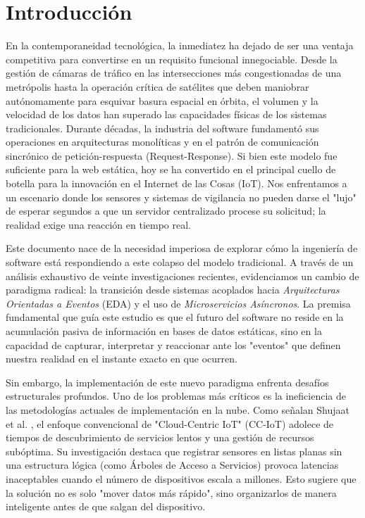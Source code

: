 \section{Introducción}

En la contemporaneidad tecnológica, la inmediatez ha dejado de ser una ventaja competitiva para convertirse en un requisito funcional innegociable. Desde la gestión de cámaras de tráfico en las intersecciones más congestionadas de una metrópolis hasta la operación crítica de satélites que deben maniobrar autónomamente para esquivar basura espacial en órbita, el volumen y la velocidad de los datos han superado las capacidades físicas de los sistemas tradicionales. Durante décadas, la industria del software fundamentó sus operaciones en arquitecturas monolíticas y en el patrón de comunicación sincrónico de petición-respuesta (Request-Response). Si bien este modelo fue suficiente para la web estática, hoy se ha convertido en el principal cuello de botella para la innovación en el Internet de las Cosas (IoT). Nos enfrentamos a un escenario donde los sensores y sistemas de vigilancia no pueden darse el "lujo" de esperar segundos a que un servidor centralizado procese su solicitud; la realidad exige una reacción en tiempo real.

Este documento nace de la necesidad imperiosa de explorar cómo la ingeniería de software está respondiendo a este colapso del modelo tradicional. A través de un análisis exhaustivo de veinte investigaciones recientes, evidenciamos un cambio de paradigma radical: la transición desde sistemas acoplados hacia \textit{Arquitecturas Orientadas a Eventos} (EDA) y el uso de \textit{Microservicios Asíncronos}. La premisa fundamental que guía este estudio es que el futuro del software no reside en la acumulación pasiva de información en bases de datos estáticas, sino en la capacidad de capturar, interpretar y reaccionar ante los "eventos" que definen nuestra realidad en el instante exacto en que ocurren.

Sin embargo, la implementación de este nuevo paradigma enfrenta desafíos estructurales profundos. Uno de los problemas más críticos es la ineficiencia de las metodologías actuales de implementación en la nube. Como señalan Shujaat et al. \cite{shujaat2021improvements}, el enfoque convencional de "Cloud-Centric IoT" (CC-IoT) adolece de tiempos de descubrimiento de servicios lentos y una gestión de recursos subóptima. Su investigación destaca que registrar sensores en listas planas sin una estructura lógica (como Árboles de Acceso a Servicios) provoca latencias inaceptables cuando el número de dispositivos escala a millones. Esto sugiere que la solución no es solo "mover datos más rápido", sino organizarlos de manera inteligente antes de que salgan del dispositivo.

